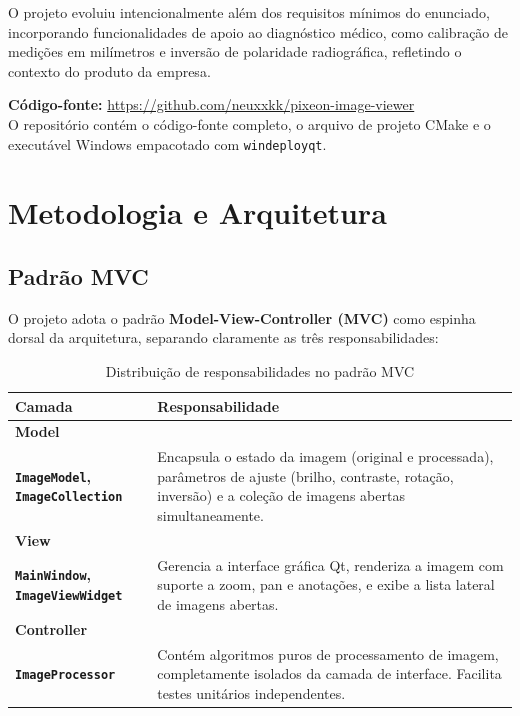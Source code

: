 \documentclass[12pt, a4paper]{article}
\begin{document}
O projeto evoluiu intencionalmente além dos requisitos mínimos do enunciado,
incorporando funcionalidades de apoio ao diagnóstico médico, como calibração de
medições em milímetros e inversão de polaridade radiográfica, refletindo o
contexto do produto da empresa.

\begin{infobox}[title={Repositório e Executável}]
  \textbf{Código-fonte:}
  \url{https://github.com/neuxxkk/pixeon-image-viewer}\\
  O repositório contém o código-fonte completo, o arquivo de projeto CMake e
  o executável Windows empacotado com \texttt{windeployqt}.
\end{infobox}

\section{Metodologia e Arquitetura}

\subsection{Padrão MVC}

O projeto adota o padrão \textbf{Model-View-Controller (MVC)} como espinha
dorsal da arquitetura, separando claramente as três responsabilidades:

\begin{table}[h!]
\centering
\caption{Distribuição de responsabilidades no padrão MVC}
\vspace{4pt}
\begin{tabularx}{\linewidth}{>{\bfseries}lX}
\toprule
Camada & Responsabilidade \\
\midrule
Model 
\\
\texttt{ImageModel}, \texttt{ImageCollection}
  & Encapsula o estado da imagem (original e processada), parâmetros de
    ajuste (brilho, contraste, rotação, inversão) e a coleção de imagens
    abertas simultaneamente. \\
\addlinespace
View \\
\texttt{MainWindow}, \texttt{ImageViewWidget}
  & Gerencia a interface gráfica Qt, renderiza a imagem com suporte a
    zoom, pan e anotações, e exibe a lista lateral de imagens abertas. \\
\addlinespace
Controller \\
\texttt{ImageProcessor}
  & Contém algoritmos puros de processamento de imagem, completamente
    isolados da camada de interface. Facilita testes unitários
    independentes. \\
\bottomrule
\end{tabularx}
\end{table}
\end{document}
